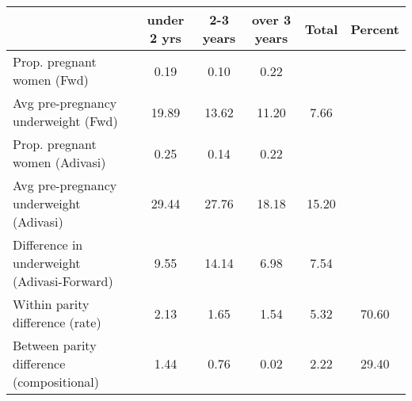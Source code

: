 \begin{tabular}{l*{5}{c}}
\toprule
            &\multicolumn{1}{c}{under 2 yrs}&\multicolumn{1}{c}{2-3 years}&\multicolumn{1}{c}{over 3 years}&\multicolumn{1}{c}{Total}&\multicolumn{1}{c}{Percent}\\
\midrule
\midrule
Prop. pregnant women (Fwd)&        0.19&        0.10&        0.22&            &            \\
Avg pre-pregnancy underweight (Fwd)&       19.89&       13.62&       11.20&        7.66&            \\
Prop. pregnant women (Adivasi)&        0.25&        0.14&        0.22&            &            \\
Avg pre-pregnancy underweight (Adivasi)&       29.44&       27.76&       18.18&       15.20&            \\
Difference in underweight (Adivasi-Forward)&        9.55&       14.14&        6.98&        7.54&            \\
Within parity difference (rate)&        2.13&        1.65&        1.54&        5.32&       70.60\\
Between parity difference (compositional)&        1.44&        0.76&        0.02&        2.22&       29.40\\
\bottomrule
\end{tabular}
